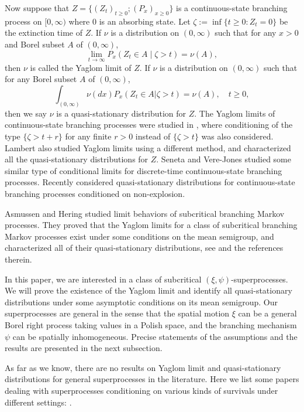 \documentclass[12pt,a4paper]{amsart}
\numberwithin{equation}{section}
\theoremstyle{plain}
\theoremstyle{definition}
\theoremstyle{remark}
\begin{document}
	Now suppose that $Z =\{(Z_t)_{t \geq 0}; (P_x)_{x\geq 0}\}$  is a  continuous-state branching process on $[0,\infty)$ where $0$ is an absorbing state.  Let
    $\zeta:=\inf\{t\geq 0: Z_t=0\}$ be the extinction time of $Z$.
	If $\nu$ is a distribution on $(0,\infty)$ such that for any $x>0$ and Borel subset $A$ of $(0,\infty)$,
\[
\lim_{t\rightarrow\infty} P_x\left(Z_t\in A\middle|\zeta>t\right)=\nu(A),
\]
	then $\nu$ is called the Yaglom limit of $Z$.
	If $\nu$ is a distribution on $(0,\infty)$ such that for any Borel subset $A$ of $(0,\infty)$,
\[
\int_{(0,\infty)} \nu(dx) P_x (Z_t \in A | \zeta > t) = \nu (A),
	\quad t\geq 0,
\]
	then we say $\nu$ is a quasi-stationary distribution for $Z$.
	The Yaglom limits of continuous-state branching processes were studied in \cite{Li00}, where conditioning of the type $\{\zeta>t+r\}$ for any finite $r>0$
    instead of $\{\zeta>t\}$ was also considered.
	Lambert \cite{Lambert2007Quasi-stationary} also studied Yaglom limits using a different method, and characterized all the quasi-stationary distributions  for $Z$.
	Seneta and Vere-Jones \cite{SenetaVere-Jones1968On} studied some similar type of conditional limits for discrete-time continuous-state branching processes.
	Recently \cite{Labbe2013Quasi-stationary} considered quasi-stationary distributions for continuous-state branching processes conditioned on non-explosion.

	Asmussen and Hering \cite{AH} studied limit behaviors of subcritical branching Markov processes.
	They proved that the Yaglom limits for a class of subcritical  branching Markov processes exist under some conditions on the mean semigroup, and
    characterized all of their quasi-stationary distributions, see \cite[Chapter 5]{AH} and the references therein.

	In this paper, we are interested in a class of subcritical $(\xi, \psi)$-superprocesses.
	We will prove the existence of the Yaglom limit and identify all  quasi-stationary distributions under some asymptotic conditions on its mean semigroup.
	Our superprocesses are general in the sense that the spatial motion $\xi$ can be a general Borel right process taking values in a Polish space,
	and the branching mechanism $\psi$ can be spatially inhomogeneous.
	Precise statements of the assumptions and the results are presented in the next subsection.
	
	As far as we know, there are no results on
	Yaglom limit and quasi-stationary distributions for general superprocesses in the  literature.
	Here we list some papers dealing with superprocesses conditioning on various kinds of survivals under different settings:
	\cite{ChampagnatRaelly2008Limit, Etheridge2003A-decomposition, Evans1992The-entrance, EvansPerkins1990Measure-valued, LiuRen2009Some, RenSongSun2019Spine, RenSongSun2018Limit, RenSongZhang2015Limit, Serlet1996Occupation}.
\end{document}
